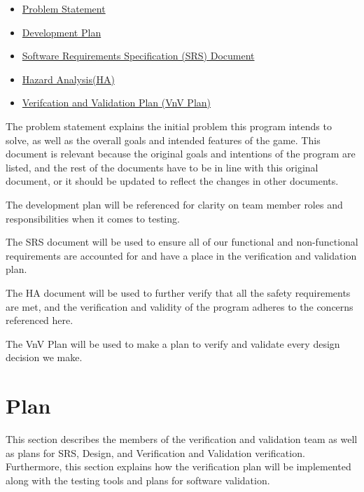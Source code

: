 \documentclass[12pt, titlepage]{article}
\begin{document}
\begin{itemize}
    \item \href{https://github.com/SammyG7/Mac-AR/blob/main/docs/ProblemStatementAndGoals/ProblemStatement.pdf}{Problem Statement}
    \item \href{https://github.com/SammyG7/Mac-AR/blob/main/docs/DevelopmentPlan/DevelopmentPlan.pdf}{Development Plan}
    \item \href{https://github.com/SammyG7/Mac-AR/blob/main/docs/SRS/SRS.pdf}{Software Requirements Specification (SRS) Document}
    \item \href{https://github.com/SammyG7/Mac-AR/blob/main/docs/HazardAnalysis/HazardAnalysis.pdf}{Hazard Analysis(HA)}
    \item \href{https://github.com/SammyG7/Mac-AR/blob/main/docs/VnVPlan/VnVPlan.pdf}{Verifcation and Validation Plan (VnV Plan)}
\end{itemize}


The problem statement explains the initial problem this program intends to solve, as well as the overall goals and intended features of the game. This document is relevant because the original goals and intentions of the program are listed, and the rest of the documents have to be in line with this original document, or it should be updated to reflect the changes in other documents. 

The development plan will be referenced for clarity on team member roles and responsibilities when it comes to testing.

The SRS document will be used to ensure all of our functional and non-functional requirements are accounted for and have a place in the verification and validation plan. 

The HA document will be used to further verify that all the safety requirements are met, and the verification and validity of the program adheres to the concerns referenced here. 

The VnV Plan will be used to make a plan to verify and validate every design decision we make.

\section{Plan}

This section describes the members of the verification and validation team as well as plans for SRS, Design, and Verification and Validation verification. Furthermore, this section explains how the verification plan will be implemented along with the testing tools and plans for software validation.
\end{document}
